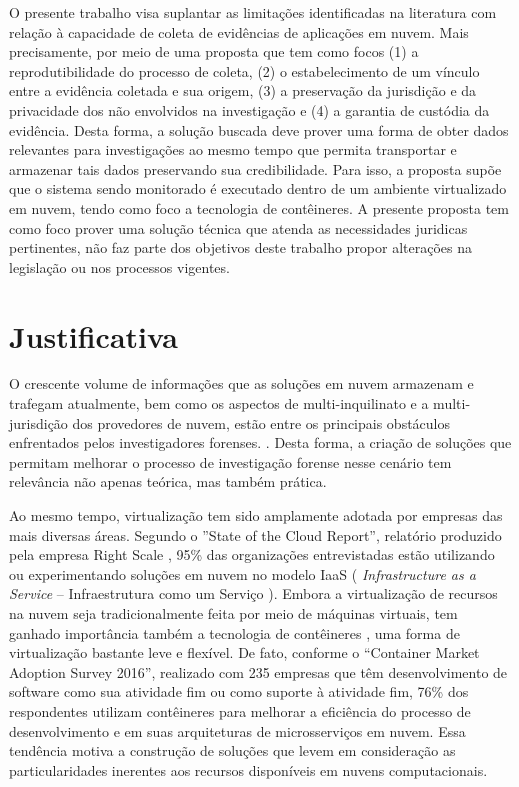 %
O presente trabalho visa suplantar as limitações identificadas na literatura com relação à capacidade de coleta de evidências de aplicações em nuvem.
%
Mais precisamente, por meio de uma proposta que tem como focos (1) a reprodutibilidade do processo de coleta, (2) o estabelecimento de um vínculo entre a evidência coletada e sua origem, (3) a preservação da jurisdição e da privacidade dos não envolvidos na investigação e (4) a garantia de custódia da evidência.
%
Desta forma, a solução buscada deve prover uma forma de obter dados relevantes para investigações ao mesmo tempo que permita transportar e armazenar tais dados preservando sua credibilidade.
%
Para isso, a proposta supõe que o sistema sendo monitorado é executado dentro de um ambiente virtualizado em nuvem, tendo como foco a tecnologia de contêineres.
%
%
A presente proposta tem como foco prover uma solução técnica que atenda as necessidades juridicas pertinentes, não faz parte dos objetivos deste trabalho propor alterações na legislação ou nos processos vigentes.



\section{Justificativa}
\label{sec:intro-justificativa}

O crescente volume de informações que as soluções em nuvem armazenam e trafegam atualmente, bem como os aspectos de multi-inquilinato e a multi-jurisdição dos provedores de nuvem, estão entre os principais obstáculos enfrentados pelos investigadores forenses. \cite{QuickIncreaseVolumeImpact:2014} \cite{BashAdvInForensics:2015}.
%
Desta forma, a criação de soluções que permitam melhorar o processo de investigação forense nesse cenário tem relevância não apenas teórica, mas também prática.


Ao mesmo tempo, virtualização tem sido amplamente adotada por empresas das mais diversas áreas. 
%
Segundo o ''State of the Cloud Report'', relatório produzido pela empresa Right Scale \cite{RightScale2017}, 95\% das organizações entrevistadas estão utilizando ou experimentando soluções em nuvem no modelo IaaS ( \textit{Infrastructure as a Service} -- Infraestrutura como um Serviço ).
%
Embora a virtualização de recursos na nuvem seja tradicionalmente feita por meio de máquinas virtuais, tem ganhado importância também a tecnologia de contêineres \cite{containers-tech:2014}, uma forma de virtualização bastante leve e flexível.
%
De fato, conforme o ``Container Market Adoption Survey 2016'', realizado com 235 empresas que têm desenvolvimento de software como sua atividade fim ou como suporte à atividade fim, 76\% dos respondentes utilizam contêineres para melhorar a eficiência do processo de desenvolvimento e em suas arquiteturas de microsserviços em nuvem.
%
Essa tendência motiva a construção de soluções que levem em consideração as particularidades inerentes aos recursos disponíveis em nuvens computacionais.



